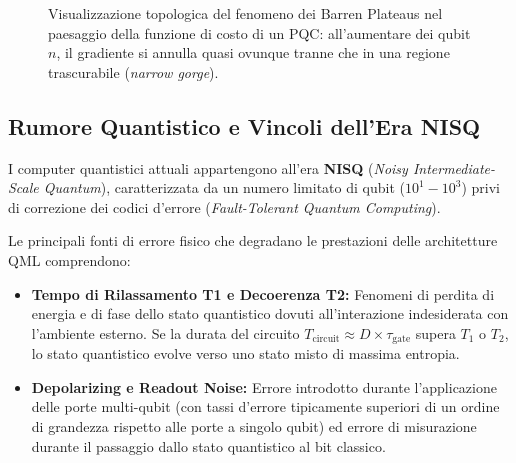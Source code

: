 \begin{figure}[htbp]
    \centering
    \caption{\footnotesize Visualizzazione topologica del fenomeno dei Barren Plateaus nel paesaggio della funzione di costo di un PQC: all'aumentare dei qubit $n$, il gradiente si annulla quasi ovunque tranne che in una regione trascurabile (\textit{narrow gorge}).}
    \label{fig:barren_plateaus}
\end{figure}

\subsection{Rumore Quantistico e Vincoli dell'Era NISQ}
\label{sec:rumore_nisq}
I computer quantistici attuali appartengono all'era \textbf{NISQ} (\textit{Noisy Intermediate-Scale Quantum}), caratterizzata da un numero limitato di qubit ($10^1 - 10^3$) privi di correzione dei codici d'errore (\textit{Fault-Tolerant Quantum Computing}).

Le principali fonti di errore fisico che degradano le prestazioni delle architetture QML comprendono:
\begin{itemize}
    \item \textbf{Tempo di Rilassamento T1 e Decoerenza T2:} Fenomeni di perdita di energia e di fase dello stato quantistico dovuti all'interazione indesiderata con l'ambiente esterno. Se la durata del circuito $T_{\text{circuit}} \approx D \times \tau_{\text{gate}}$ supera $T_1$ o $T_2$, lo stato quantistico evolve verso uno stato misto di massima entropia.
    \item \textbf{Depolarizing e Readout Noise:} Errore introdotto durante l'applicazione delle porte multi-qubit (con tassi d'errore tipicamente superiori di un ordine di grandezza rispetto alle porte a singolo qubit) ed errore di misurazione durante il passaggio dallo stato quantistico al bit classico.
\end{itemize}

